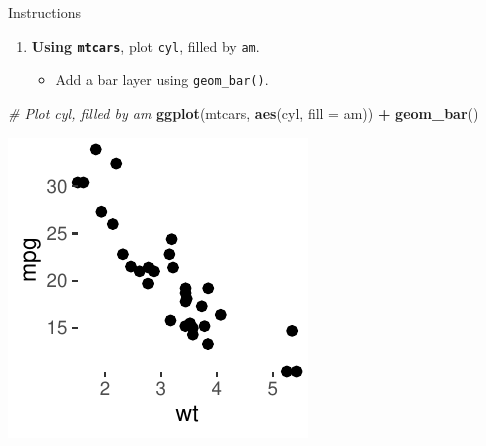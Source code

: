 \documentclass[
  ignorenonframetext,
]{beamer}
\newenvironment{Shaded}{\begin{snugshade}}{\end{snugshade}}
\newcommand{\AttributeTok}[1]{\textcolor[rgb]{0.13,0.29,0.53}{#1}}
\newcommand{\CommentTok}[1]{\textcolor[rgb]{0.56,0.35,0.01}{\textit{#1}}}
\newcommand{\FunctionTok}[1]{\textcolor[rgb]{0.13,0.29,0.53}{\textbf{#1}}}
\newcommand{\NormalTok}[1]{#1}
\newcommand{\SpecialCharTok}[1]{\textcolor[rgb]{0.81,0.36,0.00}{\textbf{#1}}}
\providecommand{\tightlist}{%
  \setlength{\itemsep}{0pt}\setlength{\parskip}{0pt}}
\begin{document}
\begin{frame}[fragile]{Instructions}
\label{instructions-3}
\begin{enumerate}
\tightlist
\item
  \textbf{Using \texttt{mtcars}}, plot \texttt{cyl}, filled by
  \texttt{am}.

  \begin{itemize}
  \tightlist
  \item
    Add a bar layer using \texttt{geom\_bar()}.
  \end{itemize}
\end{enumerate}


\begin{Shaded}
\begin{Highlighting}[]
\CommentTok{\# Plot cyl, filled by am}
\FunctionTok{ggplot}\NormalTok{(mtcars, }\FunctionTok{aes}\NormalTok{(cyl, }\AttributeTok{fill =}\NormalTok{ am)) }\SpecialCharTok{+} \FunctionTok{geom\_bar}\NormalTok{()}
\end{Highlighting}
\end{Shaded}

\begin{center}\includegraphics[width=0.5\linewidth]{Figs/unnamed-chunk-47-1} \end{center}
\end{frame}
\end{document}
